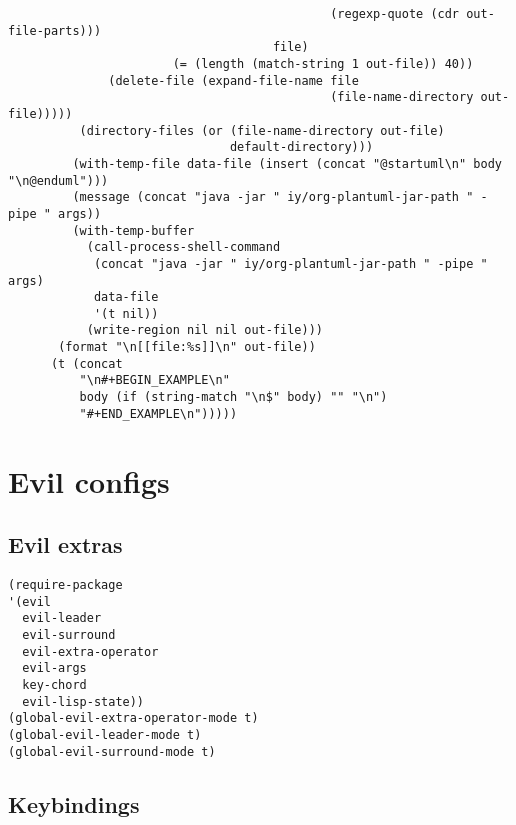 \documentclass[11pt]{article}
\begin{document}
\begin{verbatim}
                                             (regexp-quote (cdr out-file-parts)))
                                     file)
                       (= (length (match-string 1 out-file)) 40))
              (delete-file (expand-file-name file
                                             (file-name-directory out-file)))))
          (directory-files (or (file-name-directory out-file)
                               default-directory)))
         (with-temp-file data-file (insert (concat "@startuml\n" body "\n@enduml")))
         (message (concat "java -jar " iy/org-plantuml-jar-path " -pipe " args))
         (with-temp-buffer
           (call-process-shell-command
            (concat "java -jar " iy/org-plantuml-jar-path " -pipe " args)
            data-file
            '(t nil))
           (write-region nil nil out-file)))
       (format "\n[[file:%s]]\n" out-file))
      (t (concat
          "\n#+BEGIN_EXAMPLE\n"
          body (if (string-match "\n$" body) "" "\n")
          "#+END_EXAMPLE\n")))))
\end{verbatim}
\section{Evil configs}
\label{sec-11}
\subsection{Evil extras}
\label{sec-11-1}


\begin{verbatim}
(require-package 
'(evil
  evil-leader
  evil-surround
  evil-extra-operator
  evil-args
  key-chord
  evil-lisp-state))
(global-evil-extra-operator-mode t)
(global-evil-leader-mode t)
(global-evil-surround-mode t)
\end{verbatim}
\subsection{Keybindings}
\label{sec-11-2}
\end{document}
